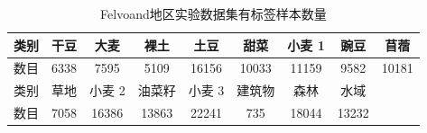 \begin{table}[h]
  \caption{Felvoand地区实验数据集有标签样本数量}
  \begin{tabular}{|c|c|c|c|c|c|c|c|c|}
    \hline 类别 & 干豆   & 大麦    & 裸土    & 土豆    & 甜菜    & 小麦 1  & 豌豆    & 苜蓿
    \\
    \hline 数目 & 6338 & 7595  & 5109  & 16156 & 10033 & 11159 & 9582  & 10181 \\
    \hline 类别 & 草地   & 小麦 2  & 油菜籽   & 小麦 3  & 建筑物   & 森林    & 水域    &       \\
    \hline 数目 & 7058 & 16386 & 13863 & 22241 & 735   & 18044 & 13232 &       \\
    \hline
  \end{tabular}
  \label{flevoland_smaple}
\end{table}


